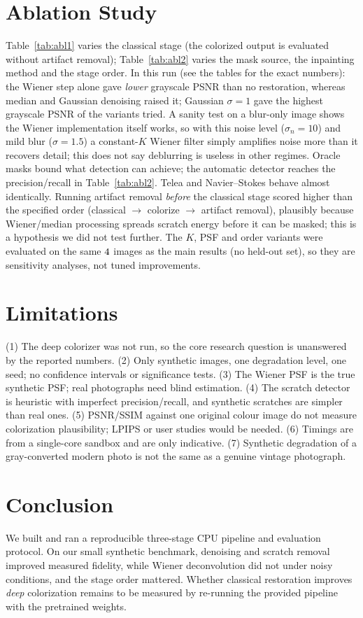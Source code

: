 \documentclass[10pt]{article}
\begin{document}
\section{Ablation Study}
Table~\ref{tab:abl1} varies the classical stage (the colorized output is evaluated without artifact removal); Table~\ref{tab:abl2} varies the mask source, the inpainting method and the stage order.
In this run (see the tables for the exact numbers): the Wiener step alone gave \emph{lower} grayscale PSNR than no restoration, whereas median and Gaussian denoising raised it; Gaussian $\sigma=1$ gave the highest grayscale PSNR of the variants tried.
A sanity test on a blur-only image shows the Wiener implementation itself works, so with this noise level ($\sigma_n=10$) and mild blur ($\sigma=1.5$) a constant-$K$ Wiener filter simply amplifies noise more than it recovers detail; this does not say deblurring is useless in other regimes.
Oracle masks bound what detection can achieve; the automatic detector reaches the precision/recall in Table~\ref{tab:abl2}. Telea and Navier--Stokes behave almost identically. Running artifact removal \emph{before} the classical stage scored higher than the specified order (classical $\rightarrow$ colorize $\rightarrow$ artifact removal),
plausibly because Wiener/median processing spreads scratch energy before it can be masked; this is a hypothesis we did not test further. The $K$, PSF and order variants were evaluated on the same $4$ images as the main results (no held-out set), so they are sensitivity analyses, not tuned improvements.

\section{Limitations}
(1) The deep colorizer was not run, so the core research question is unanswered by the reported numbers. (2) Only \NImages{} synthetic images, one degradation level, one seed; no confidence intervals or significance tests. (3) The Wiener PSF is the true synthetic PSF; real photographs need blind estimation.
(4) The scratch detector is heuristic with imperfect precision/recall, and synthetic scratches are simpler than real ones. (5) PSNR/SSIM against one original colour image do not measure colorization plausibility; LPIPS or user studies would be needed. (6) Timings are from a single-core sandbox and are only indicative.
(7) Synthetic degradation of a gray-converted modern photo is not the same as a genuine vintage photograph.

\section{Conclusion}
We built and ran a reproducible three-stage CPU pipeline and evaluation protocol. On our small synthetic benchmark, denoising and scratch removal improved measured fidelity, while Wiener deconvolution did not under noisy conditions,
and the stage order mattered. Whether classical restoration improves \emph{deep} colorization remains to be measured by re-running the provided pipeline with the pretrained weights.



\end{document}
